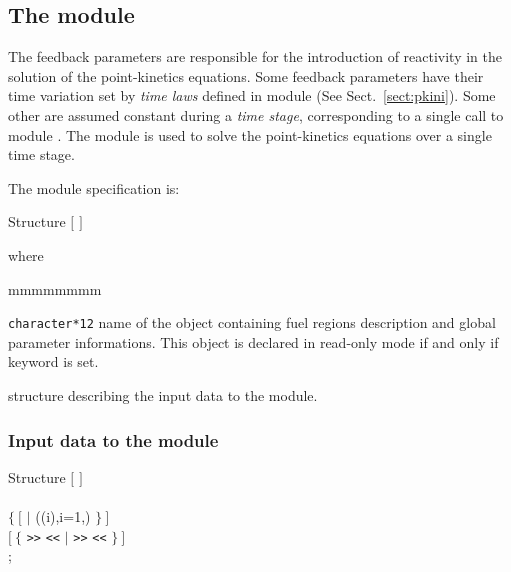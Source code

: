 \subsection{The  module}\label{sect:pkins}

\vskip 0.2cm
The feedback parameters are responsible for the introduction of reactivity in the solution of the point-kinetics equations.
Some feedback parameters have their time variation set by {\sl time laws} defined in module   (See Sect.~\ref{sect:pkini}).
Some other are assumed constant during a {\sl time stage}, corresponding to a single call to module . The 
module is used to solve the point-kinetics equations over a single time stage.

\vskip 0.08cm

\noindent
The  module specification is:

\begin{DataStructure}{Structure }
$[$  \moc{:=} $]$   \moc{::} 
\end{DataStructure}

\noindent where

\begin{ListeDeDescription}{mmmmmmmm}

\item[\dusa{MAPFL}] \texttt{character*12} name of the  
object containing fuel regions description and global parameter informations. This object is declared
in read-only mode if and only if keyword  is set.

\item[\dstr{descpkins}] structure describing the input data to the  module. 

\end{ListeDeDescription}

\vskip 0.2cm

\subsubsection{Input data to the  module}\label{sect:pkinsstr}

\begin{DataStructure}{Structure }
$[$   $]$ \\
   \\
$\{~[$   $|$  ((i),i=1,) $\}~]$ \\
$[~\{$   {\tt >>}  {\tt <<} $|$   {\tt >>}  {\tt <<} $\}~]$ \\
;
\end{DataStructure}

